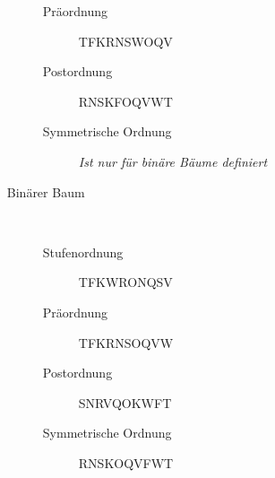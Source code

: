 \documentclass[11pt]{article}
\begin{document}
\begin{enumerate}[a)]
\begin{description}
\begin{description}
          \item[Präordnung]
            TFKRNSWOQV

          \item[Postordnung]
            RNSKFOQVWT

          \item[Symmetrische Ordnung]
            \emph{Ist nur für binäre Bäume definiert}

        \end{description}

      \item[Binärer Baum] $ $
        \begin{description}

          \item[Stufenordnung] 
            TFKWRONQSV

          \item[Präordnung]
            TFKRNSOQVW

          \item[Postordnung]
            SNRVQOKWFT

          \item[Symmetrische Ordnung]
            RNSKOQVFWT

        \end{description}
    \end{description}
    
\end{enumerate} 
\end{document}
